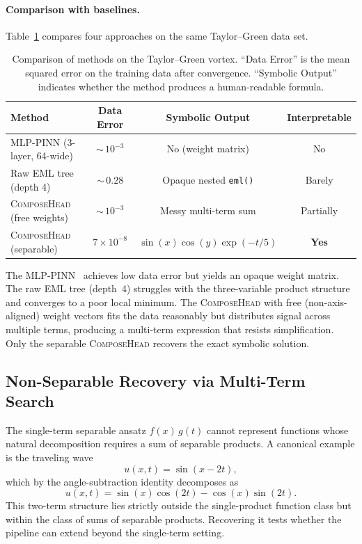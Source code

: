 \paragraph{Comparison with baselines.}
Table~\ref{tab:tgv_comparison} compares four approaches on the same
Taylor--Green data set.

\begin{table}[t]
  \centering
  \caption{Comparison of methods on the Taylor--Green vortex.  ``Data Error''
    is the mean squared error on the training data after convergence.
    ``Symbolic Output'' indicates whether the method produces a human-readable
    formula.}
  \label{tab:tgv_comparison}
  \smallskip
  \begin{tabular}{@{}lccc@{}}
    \toprule
    Method & Data Error & Symbolic Output & Interpretable \\
    \midrule
    MLP-PINN (3-layer, 64-wide)
      & ${\sim}\,10^{-3}$ & No (weight matrix) & No \\
    Raw EML tree (depth 4)
      & ${\sim}\,0.28$    & Opaque nested \texttt{eml()} & Barely \\
    \textsc{ComposeHead} (free weights)
      & ${\sim}\,10^{-3}$ & Messy multi-term sum & Partially \\
    \textsc{ComposeHead} (separable)
      & $7\!\times\!10^{-8}$ & $\sin(x)\cos(y)\exp(-t/5)$ & \textbf{Yes} \\
    \bottomrule
  \end{tabular}
\end{table}

The MLP-PINN~\citep{raissi2019} achieves low data error but yields an opaque
weight matrix.  The raw EML tree (depth~4) struggles with the three-variable
product structure and converges to a poor local minimum.  The
\textsc{ComposeHead} with free (non-axis-aligned) weight vectors fits the data
reasonably but distributes signal across multiple terms, producing a multi-term
expression that resists simplification.  Only the separable
\textsc{ComposeHead} recovers the exact symbolic solution.

\subsection{Non-Separable Recovery via Multi-Term Search}
\label{sec:nonseparable}

The single-term separable ansatz $f(x)\,g(t)$ cannot represent functions whose
natural decomposition requires a sum of separable products.  A canonical
example is the traveling wave
\begin{equation}
  u(x,t) = \sin(x - 2t),
  \label{eq:traveling}
\end{equation}
which by the angle-subtraction identity decomposes as
\begin{equation}
  u(x,t) = \sin(x)\cos(2t) - \cos(x)\sin(2t).
  \label{eq:traveling_decomp}
\end{equation}
This two-term structure lies strictly outside the single-product function class
but within the class of sums of separable products.  Recovering it tests
whether the pipeline can extend beyond the single-term setting.

